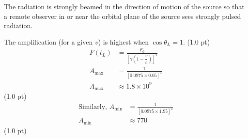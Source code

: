 \begin{description}
  The radiation is strongly beamed in the direction of motion of the source
  so that a remote observer in or near the orbital plane of the source sees
  strongly pulsed radiation.
\item[(f)] The amplification (for a given $v$) is highest when
  $\cos\theta_L = 1$. \hfill(1.0 pt)
  \begin{align*}
    F(t_L) &= \frac{F_0}{\left[\gamma\left(1 - \dfrac{v}{c}\right)\right]^4}\\
    A_{\max} &= \frac{1}{\left[0.0975 \times 0.05\right]^4}\\
    A_{\max} &\approx 1.8 \times 10^9
  \end{align*}
  \hfill(1.0 pt)
  \begin{align*}
    \text{Similarly, } A_{\min}
      &= \frac{1}{\left[0.0975 \times 1.95\right]^4}\\
    A_{\min} &\approx 770
  \end{align*}
  \hfill(1.0 pt)
\end{description}

